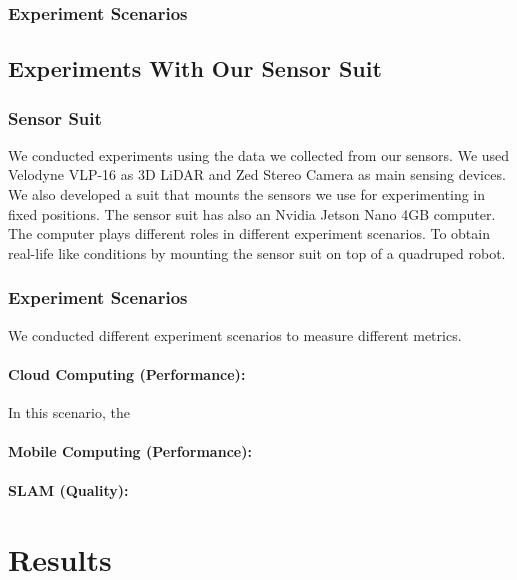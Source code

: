 \documentclass[conference]{IEEEtran}
\begin{document}
\subsubsection{Experiment Scenarios}

\subsection{Experiments With Our Sensor Suit}

\subsubsection{Sensor Suit}
We conducted experiments using the data we collected from our sensors. We used Velodyne VLP-16 as 3D LiDAR and Zed Stereo Camera as main sensing devices. We also developed a suit that mounts the sensors we use for experimenting in fixed positions. The sensor suit has also an Nvidia Jetson Nano 4GB computer. The computer plays different roles in different experiment scenarios.
To obtain real-life like conditions by mounting the sensor suit on top of a quadruped robot.

\subsubsection{Experiment Scenarios}
We conducted different experiment scenarios to measure different metrics.
\paragraph{Cloud Computing (Performance):}
In  this scenario, the 
\paragraph{Mobile Computing (Performance):}
\paragraph{SLAM (Quality):}


\section{Results}
\end{document}
